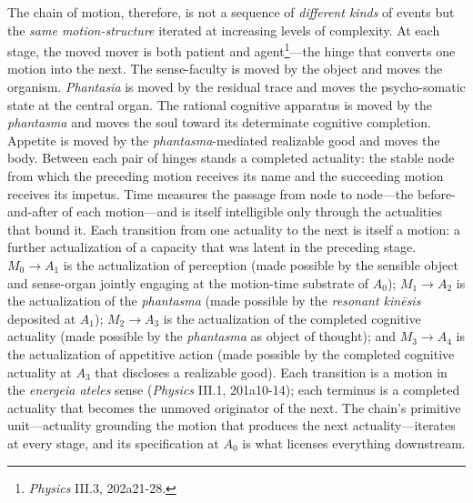 \documentclass{article}
\begin{document}
The chain of motion, therefore, is not a sequence of \textit{different kinds} of events but the \textit{same motion-structure} iterated at increasing levels of complexity. At each stage, the moved mover is both patient and agent\footnote{\textit{Physics} III.3, 202a21-28.}---the hinge that converts one motion into the next. The sense-faculty is moved by the object and moves the organism. \textit{Phantasia} is moved by the residual trace and moves the psycho-somatic state at the central organ. The rational cognitive apparatus is moved by the \textit{phantasma} and moves the soul toward its determinate cognitive completion. Appetite is moved by the \textit{phantasma}-mediated realizable good and moves the body. Between each pair of hinges stands a completed actuality: the stable node from which the preceding motion receives its name and the succeeding motion receives its impetus. Time measures the passage from node to node---the before-and-after of each motion---and is itself intelligible only through the actualities that bound it. Each transition from one actuality to the next is itself a motion: a further actualization of a capacity that was latent in the preceding stage. $M_0 \rightarrow A_1$ is the actualization of perception (made possible by the sensible object and sense-organ jointly engaging at the motion-time substrate of $A_0$); $M_1 \rightarrow A_2$ is the actualization of the \textit{phantasma} (made possible by the \textit{resonant kinēsis} deposited at $A_1$); $M_2 \rightarrow A_3$ is the actualization of the completed cognitive actuality (made possible by the \textit{phantasma} as object of thought); and $M_3 \rightarrow A_4$ is the actualization of appetitive action (made possible by the completed cognitive actuality at $A_3$ that discloses a realizable good). Each transition is a motion in the \textit{energeia ateles} sense (\textit{Physics} III.1, 201a10-14); each terminus is a completed actuality that becomes the unmoved originator of the next. The chain's primitive unit---actuality grounding the motion that produces the next actuality---iterates at every stage, and its specification at $A_0$ is what licenses everything downstream. 
\end{document}
